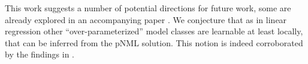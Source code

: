 \documentclass[conference,letterpaper]{IEEEtran}
\begin{document}
This work suggests a number of potential directions for future work, some are already explored in an accompanying paper \cite{pNML_neural_networks}. 
We conjecture that as in linear regression other ``over-parameterized'' model classes are learnable at least locally, that can be inferred from the pNML solution. 
This notion is indeed corroborated by the findings in \cite{pNML_neural_networks}.





%
%




\end{document}
